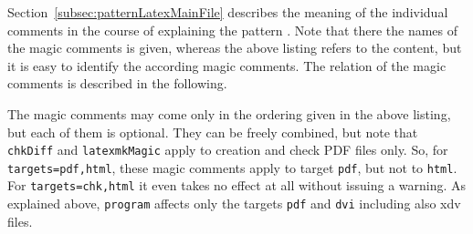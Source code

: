 Section~\ref{subsec:patternLatexMainFile} 
describes the meaning of the individual comments 
in the course of explaining the pattern . 
Note that there the names of the magic comments is given, whereas the above listing refers to the content, 
but it is easy to identify the according magic comments. 
The relation of the magic comments is described in the following. 

The magic comments may come only in the ordering given in the above listing, 
but each of them is optional. 
They can be freely combined, 
but note that \texttt{chkDiff} and \texttt{latexmkMagic} 
apply to creation and check PDF files only. 
So, for \texttt{targets=pdf,html}, these magic comments apply to target \texttt{pdf}, 
but not to \texttt{html}. 
For \texttt{targets=chk,html} it even takes no effect at all 
without issuing a warning. 
As explained above, \texttt{program} affects 
only the targets \texttt{pdf} and \texttt{dvi} including also \gls{xdv} files. 









